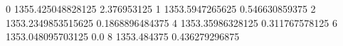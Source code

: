 0 1355.425048828125 2.376953125
1 1353.5947265625 0.546630859375
2 1353.2349853515625 0.1868896484375
4 1353.35986328125 0.311767578125
6 1353.048095703125 0.0
8 1353.484375 0.436279296875
